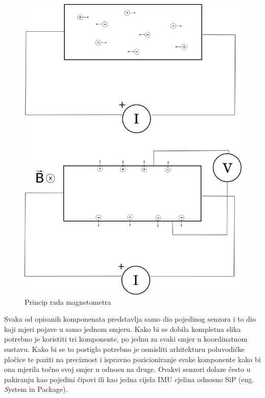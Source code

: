 \documentclass[times, utf8, diplomski]{fer}
\begin{document}
\begin{figure}[h!]
    \includegraphics[width=\textwidth]{mag.png}
    \caption{Princip rada magnetometra}
    \label{mag}
\end{figure}

Svaka od opisanih komponenata predstavlja samo dio pojedinog senzora i to dio koji mjeri pojave u samo jednom smjeru. Kako bi se
dobila kompletna slika potrebno je koristiti tri komponente, po jednu za svaki smjer u koordinatnom sustavu. Kako bi se to postiglo
potrebno je osmisliti arhitekturu poluvodičke pločice te paziti na preciznost i ispravno pozicioniranje svake komponente kako bi
ona mjerila točno svoj smjer u odnosu na druge. Ovakvi senzori dolaze često u pakiranju kao pojedini čipovi ili kao jedna cijela
IMU cjelina odnosno SiP (eng. \textit System in Package).
\end{document}
